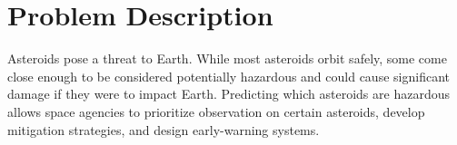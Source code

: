 \documentclass{article}
\begin{document}
\section{Problem Description}
Asteroids pose a threat to Earth.
While most asteroids orbit safely, some come close enough to be considered potentially hazardous and could cause significant damage if they were to impact Earth.
Predicting which asteroids are hazardous allows space agencies to prioritize observation on certain asteroids, develop mitigation strategies, and design early-warning systems.
\end{document}
